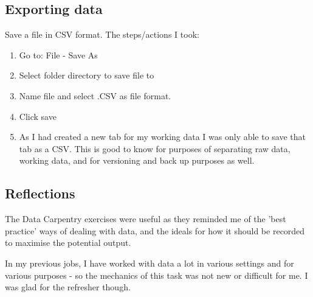 \documentclass{article}
\begin{document}
\subsection{Exporting data}
Save a file in CSV format.
The steps/actions I took:
\begin{enumerate}
    \item Go to: File - Save As
    \item Select folder directory to save file to
    \item Name file and select .CSV as file format.
    \item Click save
    \item As I had created a new tab for my working data I was only able to save that tab as a CSV. This is good to know for purposes of separating raw data, working data, and for versioning and back up purposes as well. 
\end{enumerate}

\subsection{Reflections}
The Data Carpentry exercises were useful as they reminded me of the 'best practice' ways of dealing with data, and the ideals for how it should be recorded to maximise the potential output. 

In my previous  jobs, I have worked with data a lot in various settings and for various purposes - so the mechanics of this task was not new or difficult for me. I was glad for the refresher though. 
\end{document}
